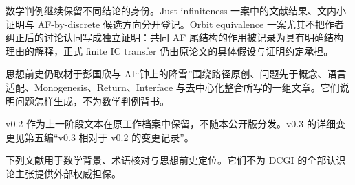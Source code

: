 \documentclass[UTF8,zihao=-4,fontset=none,oneside,openany]{ctexbook}
\begin{document}
数学判例继续保留不同结论的身份。Just infiniteness 一案中的文献结果、文内小证明与 AF-by-discrete 候选方向分开登记。Orbit equivalence 一案尤其不把作者纠正后的讨论认同写成独立证明：共同 AF 尾结构的作用被记录为具有明确结构理由的解释，正式 finite IC transfer 仍由原论文的具体假设与证明约定承担。

思想前史仍取材于彭国欣与 AI“钟上的降雪”围绕路径原创、问题先于概念、语言适配、Monogenesis、Return、Interface 与去中心化整合所写的一组文章。它们说明问题怎样生成，不为数学判例背书。

v0.2 作为上一阶段文本在原工作档案中保留，不随本公开版分发。v0.3 的详细变更见第五编“v0.3 相对于 v0.2 的变更记录”。

下列文献用于数学背景、术语核对与思想前史定位。它们不为 DCGI 的全部认识论主张提供外部权威担保。

\clearpage
{}
{}
\end{document}

